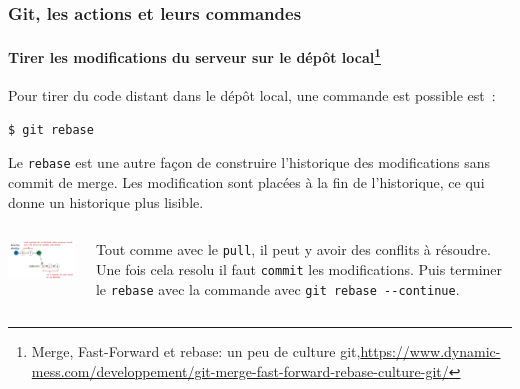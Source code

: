 \documentclass{beamer}
\begin{document}
    \begin{frame}[fragile]
        \frametitle{Git, les actions et leurs commandes}
        \framesubtitle{Tirer les modifications du serveur sur le dépôt local\footnote{Merge, Fast-Forward et rebase: un peu de culture git,\url{https://www.dynamic-mess.com/developpement/git-merge-fast-forward-rebase-culture-git/}}}
        \transdissolve

        Pour tirer du code distant dans le dépôt local, une commande est possible est~:
        \begin{lstlisting}[language=sh]
$ git rebase
        \end{lstlisting}

        Le \lstinline{rebase} est une autre façon de construire l'historique des modifications sans commit de merge.
        Les modification sont placées à la fin de l'historique, ce qui donne un historique plus lisible.
        \begin{columns}
            \begin{center}
                \includegraphics[width=5cm]{image/git-rebase.jpg}
            \end{center}
            Tout comme avec le \lstinline{pull}, il peut y avoir des conflits à résoudre.
            Une fois cela resolu il faut \lstinline{commit} les modifications.
            Puis terminer le \lstinline{rebase} avec la commande avec \lstinline{git rebase --continue}\footnotemark.
        \end{columns}
    \end{frame}
\end{document}
